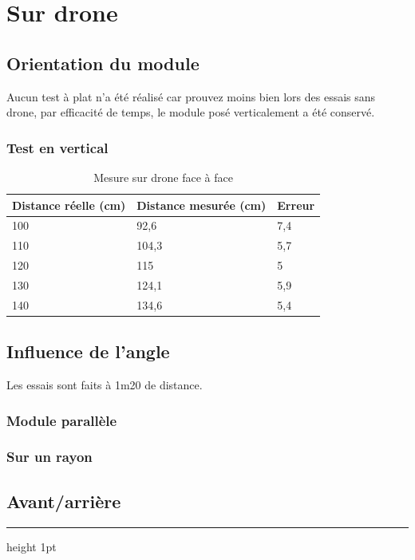 \documentclass[11pt,a4paper]{article}
\begin{document}
\section{Sur drone}

\subsection{Orientation du module}
Aucun test à plat n'a été réalisé car prouvez moins bien lors des essais sans drone, par efficacité de temps, le module posé verticalement a été conservé. 
\subsubsection{Test en vertical}

\begin{table}[H]
    \centering
    \begin{tabular}{|l|l|l|}
    \hline
        Distance réelle (cm) & Distance mesurée (cm) & Erreur  \\ \hline
        100 & 92,6 & 7,4 \\ \hline
        110 & 104,3 & 5,7 \\ \hline
        120 & 115 & 5 \\ \hline
        130 & 124,1 & 5,9 \\ \hline
        140 & 134,6 & 5,4 \\ \hline
    \end{tabular}
    \caption{Mesure sur drone face à face  }
\end{table}
\subsection{Influence de l'angle}
Les essais sont faits à 1m20 de distance. 
\subsubsection{Module parallèle}

\subsubsection{Sur un rayon}

\subsection{Avant/arrière}



\vspace{0.4cm}

\vfill
\hrule height 1pt
\end{document}
